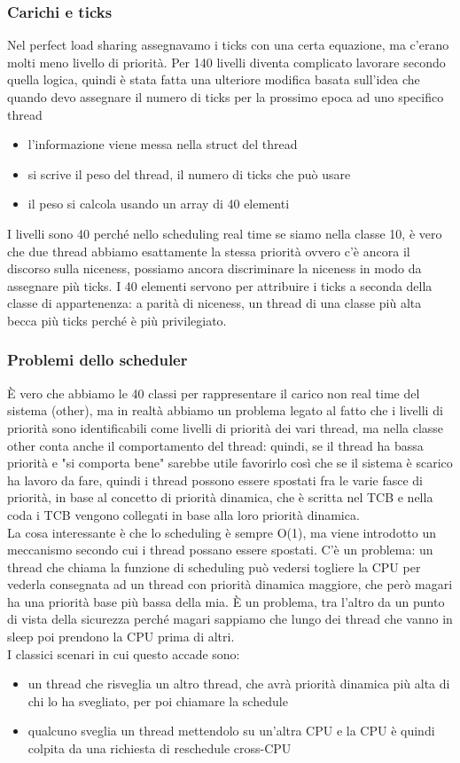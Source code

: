 \documentclass[12pt, oneside]{extbook}
\begin{document}
\subsubsection{Carichi e ticks}
Nel perfect load sharing assegnavamo i ticks con una certa equazione, ma c'erano molti meno livello di priorità. Per 140 livelli diventa complicato lavorare secondo quella logica, quindi è stata fatta una ulteriore modifica basata sull'idea che quando devo assegnare il numero di ticks per la prossimo epoca ad uno specifico thread
\begin{itemize}
\item l'informazione viene messa nella struct del thread
\item si scrive il peso del thread, il numero di ticks che può usare
\item il peso si calcola usando un array di 40 elementi
\end{itemize}
I livelli sono 40 perché nello scheduling real time se siamo nella classe 10, è vero che due thread abbiamo esattamente la stessa priorità ovvero c'è ancora il discorso sulla niceness, possiamo ancora discriminare la niceness in modo da assegnare più ticks. I 40 elementi servono per attribuire i ticks a seconda della classe di appartenenza: a parità di niceness, un thread di una classe più alta becca più ticks perché è più privilegiato.
\subsubsection{Problemi dello scheduler}
È vero che abbiamo le 40 classi per rappresentare il carico non real time del sistema (other), ma in realtà abbiamo un problema legato al fatto che i livelli di priorità sono identificabili come livelli di priorità dei vari thread, ma nella classe other conta anche il comportamento del thread: quindi, se il thread ha bassa priorità e "si comporta bene" sarebbe utile favorirlo così che se il sistema è scarico ha lavoro da fare, quindi i thread possono essere spostati fra le varie fasce di priorità, in base al concetto di priorità dinamica, che è scritta nel TCB e nella coda i TCB vengono collegati in base alla loro priorità dinamica.\\La cosa interessante è che lo scheduling è sempre O(1), ma viene introdotto un meccanismo secondo cui i thread possano essere spostati. C'è un problema: un thread che chiama la funzione di scheduling può vedersi togliere la CPU per vederla consegnata ad un thread con priorità dinamica maggiore, che però magari ha una priorità base più bassa della mia. È un problema, tra l'altro da un punto di vista della sicurezza perché magari sappiamo che lungo dei thread che vanno in sleep poi prendono la CPU prima di altri.\\I classici scenari in cui questo accade sono:
\begin{itemize}
\item un thread che risveglia un altro thread, che avrà priorità dinamica più alta di chi lo ha svegliato, per poi chiamare la schedule
\item qualcuno sveglia un thread mettendolo su un'altra CPU e la CPU è quindi colpita da una richiesta di reschedule cross-CPU
\end{itemize}
\end{document}
